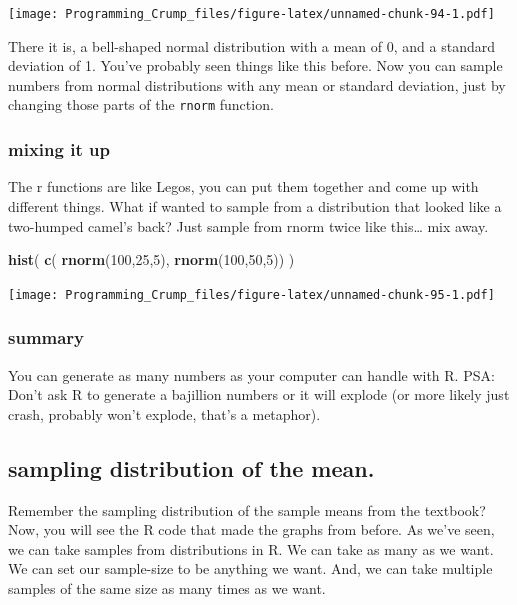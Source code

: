 \documentclass[]{book}
\newenvironment{Shaded}{\begin{snugshade}}{\end{snugshade}}
\newcommand{\KeywordTok}[1]{\textcolor[rgb]{0.13,0.29,0.53}{\textbf{{#1}}}}
\newcommand{\DecValTok}[1]{\textcolor[rgb]{0.00,0.00,0.81}{{#1}}}
\newcommand{\NormalTok}[1]{{#1}}
\theoremstyle{definition}
\theoremstyle{definition}
\theoremstyle{definition}
\theoremstyle{remark}
\begin{document}
\texttt{[image: Programming\_Crump\_files/figure-latex/unnamed-chunk-94-1.pdf]}

There it is, a bell-shaped normal distribution with a mean of 0, and a
standard deviation of 1. You've probably seen things like this before.
Now you can sample numbers from normal distributions with any mean or
standard deviation, just by changing those parts of the \texttt{rnorm}
function.

\subsubsection{mixing it up}\label{mixing-it-up}

The r functions are like Legos, you can put them together and come up
with different things. What if wanted to sample from a distribution that
looked like a two-humped camel's back? Just sample from rnorm twice like
this\ldots{} mix away.

\begin{Shaded}
\begin{Highlighting}[]
\KeywordTok{hist}\NormalTok{( }\KeywordTok{c}\NormalTok{( }\KeywordTok{rnorm}\NormalTok{(}\DecValTok{100}\NormalTok{,}\DecValTok{25}\NormalTok{,}\DecValTok{5}\NormalTok{), }\KeywordTok{rnorm}\NormalTok{(}\DecValTok{100}\NormalTok{,}\DecValTok{50}\NormalTok{,}\DecValTok{5}\NormalTok{)) )}
\end{Highlighting}
\end{Shaded}

\texttt{[image: Programming\_Crump\_files/figure-latex/unnamed-chunk-95-1.pdf]}

\subsubsection{summary}\label{summary}

You can generate as many numbers as your computer can handle with R.
PSA: Don't ask R to generate a bajillion numbers or it will explode (or
more likely just crash, probably won't explode, that's a metaphor).

\subsection{sampling distribution of the
mean.}\label{sampling-distribution-of-the-mean.}

Remember the sampling distribution of the sample means from the
textbook? Now, you will see the R code that made the graphs from before.
As we've seen, we can take samples from distributions in R. We can take
as many as we want. We can set our sample-size to be anything we want.
And, we can take multiple samples of the same size as many times as we
want.
\end{document}
